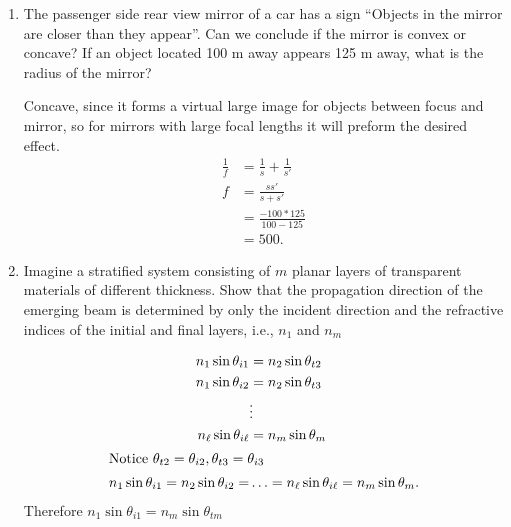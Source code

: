 \documentclass{zc-ust-hw}
\begin{document}
\begin{enumerate}
    \newpage
    
  \item The passenger side rear view mirror of a car has a sign ``Objects in the
    mirror are closer than they appear''. Can we conclude if the mirror is
    convex or concave? If an object located 100 m away appears 125 m away, what
    is the radius of the mirror?
    \begin{sol}
      Concave, since it forms a virtual large image for objects between focus
      and mirror, so for mirrors with large focal lengths it will preform the
      desired effect.
      \begin{align}
        \frac{1}{f} &= \frac{1}{s} + \frac{1}{s'} \\
        f &= \frac{ss'}{s+s'} \\
        &= \frac{-100*125}{100-125} \\
        &= 500
      .\end{align}
    \end{sol}

  \item Imagine a stratified system consisting of $m$ planar layers of
    transparent materials of different thickness. Show that the propagation
    direction of the emerging beam is determined by only the incident direction
    and the refractive indices of the initial and final layers, i.e., $n_1$ and $n_m$
    \begin{sol}
      \begin{align}
        n_{1}\sin \theta_{i 1} &= n_{2}\sin \theta_{t 2} \\
        n_{1}\sin \theta_{i 2} &= n_{2}\sin \theta_{t 3} \\
        &\vdots \\
        n_{\ell}\sin \theta_{i \ell} &= n_{m}\sin \theta_{m} \\
        \intertext{Notice \( \theta_{t 2}=\theta_{i 2},\theta_{t 3}=\theta_{i 3} \)}
        n_{1}\sin \theta_{i 1} = n_{2}\sin \theta_{i 2} = &\ldots = n_{\ell}\sin \theta_{i \ell} = n_{m}\sin \theta_{m}
      .\end{align}
      Therefore \( n_{1}\sin \theta_{i 1} = n_m\sin \theta_{tm} \)
    \end{sol}

    \newpage


\end{enumerate}
\end{document}
